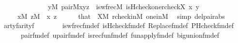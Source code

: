 \begin{isabellebody}
\ \ \ \ \ \ \ \ \ \ \ \ \ \ {\isacharparenleft}{\kern0pt}{\isasymexists}y{\isasymin}M{\isachardot}{\kern0pt}\ pair{\isacharparenleft}{\kern0pt}{\isacharhash}{\kern0pt}{\isacharhash}{\kern0pt}M{\isacharcomma}{\kern0pt}x{\isacharcomma}{\kern0pt}y{\isacharcomma}{\kern0pt}z{\isacharparenright}{\kern0pt}\ {\isacharampersand}{\kern0pt}\ is{\isacharunderscore}{\kern0pt}wfrec{\isacharparenleft}{\kern0pt}{\isacharhash}{\kern0pt}{\isacharhash}{\kern0pt}M{\isacharcomma}{\kern0pt}\ is{\isacharunderscore}{\kern0pt}Hcheck{\isacharparenleft}{\kern0pt}one{\isacharparenright}{\kern0pt}{\isacharcomma}{\kern0pt}rcheck{\isacharparenleft}{\kern0pt}X{\isacharparenright}{\kern0pt}{\isacharcomma}{\kern0pt}\ x{\isacharcomma}{\kern0pt}\ y{\isacharparenright}{\kern0pt}{\isacharparenright}{\kern0pt}{\isachardoublequoteclose}\isanewline
\ \ \ \ \ {\isachardoublequoteopen}x{\isasymin}M{\isachardoublequoteclose}\ {\isachardoublequoteopen}z{\isasymin}M{\isachardoublequoteclose}\ \ x\ z\isanewline
\ \ \ \ \isamarkupfalse%
\ that\ {}\ {\isacartoucheopen}X{\isasymin}M{\isacartoucheclose}\ rcheck{\isacharunderscore}{\kern0pt}in{\isacharunderscore}{\kern0pt}M\ one{\isacharunderscore}{\kern0pt}in{\isacharunderscore}{\kern0pt}M\ \isamarkupfalse%
\ {\isacharparenleft}{\kern0pt}simp\ del{\isacharcolon}{\kern0pt}pair{\isacharunderscore}{\kern0pt}abs{\isacharparenright}{\kern0pt}\isanewline
\ \ \isamarkupfalse%
\ artyf{\isacharcolon}{\kern0pt}{\isachardoublequoteopen}arity{\isacharparenleft}{\kern0pt}{\isacharquery}{\kern0pt}f{\isacharparenright}{\kern0pt}\ {\isacharequal}{\kern0pt}\ {}{\isachardoublequoteclose}\isanewline
\ \ \ \ \isamarkupfalse%
\ is{\isacharunderscore}{\kern0pt}wfrec{\isacharunderscore}{\kern0pt}fm{\isacharunderscore}{\kern0pt}def\ is{\isacharunderscore}{\kern0pt}Hcheck{\isacharunderscore}{\kern0pt}fm{\isacharunderscore}{\kern0pt}def\ Replace{\isacharunderscore}{\kern0pt}fm{\isacharunderscore}{\kern0pt}def\ PHcheck{\isacharunderscore}{\kern0pt}fm{\isacharunderscore}{\kern0pt}def\isanewline
\ \ \ \ \ \ pair{\isacharunderscore}{\kern0pt}fm{\isacharunderscore}{\kern0pt}def\ upair{\isacharunderscore}{\kern0pt}fm{\isacharunderscore}{\kern0pt}def\ is{\isacharunderscore}{\kern0pt}recfun{\isacharunderscore}{\kern0pt}fm{\isacharunderscore}{\kern0pt}def\ fun{\isacharunderscore}{\kern0pt}apply{\isacharunderscore}{\kern0pt}fm{\isacharunderscore}{\kern0pt}def\ big{\isacharunderscore}{\kern0pt}union{\isacharunderscore}{\kern0pt}fm{\isacharunderscore}{\kern0pt}def\isanewline

\end{isabellebody}
